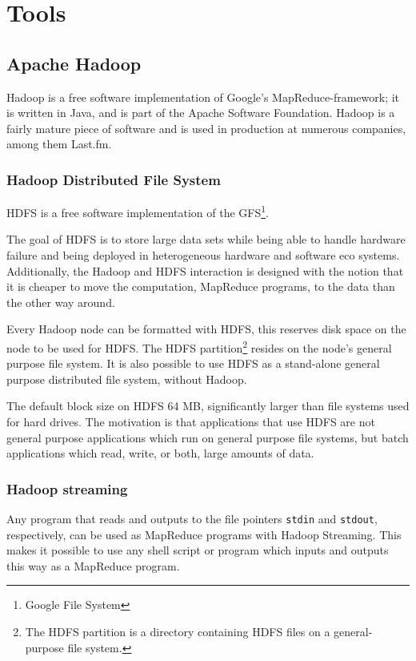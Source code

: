 \section{Tools}

\subsection{Apache Hadoop}

Hadoop is a free software implementation of Google's MapReduce-framework; it is
written in Java, and is part of the Apache Software Foundation. Hadoop is a
fairly mature piece of software and is used in production at numerous companies,
among them Last.fm. \cite{hadoop}


\subsubsection{Hadoop Distributed File System}

HDFS is a free software implementation of the GFS\footnote{Google File System}.
\cite{gfs}

The goal of HDFS is to store large data sets while being able to handle
hardware failure and being deployed in heterogeneous hardware and software
eco systems. Additionally, the Hadoop and HDFS interaction is designed with
the notion that it is cheaper to move the computation, MapReduce programs,
to the data than the other way around.

Every Hadoop node can be formatted with HDFS, this reserves disk space on the
node to be used for HDFS. The HDFS partition\footnote{The HDFS partition is a
directory containing HDFS files on a general-purpose file system.} resides on
the node's general purpose file system. It is also possible to use HDFS as a
stand-alone general purpose distributed file system, without Hadoop.

The default block size on HDFS 64 MB, significantly larger than
file systems used for hard drives. The motivation is that applications
that use HDFS are not general purpose applications which run on general
purpose file systems, but batch applications which read, write, or both,
large amounts of data.


\subsubsection{Hadoop streaming}

Any program that reads and outputs to the file pointers \texttt{stdin} and
\texttt{stdout}, respectively, can be used as MapReduce programs with
Hadoop Streaming. This makes it possible to use any shell script or
program which inputs and outputs this way as a MapReduce program.


